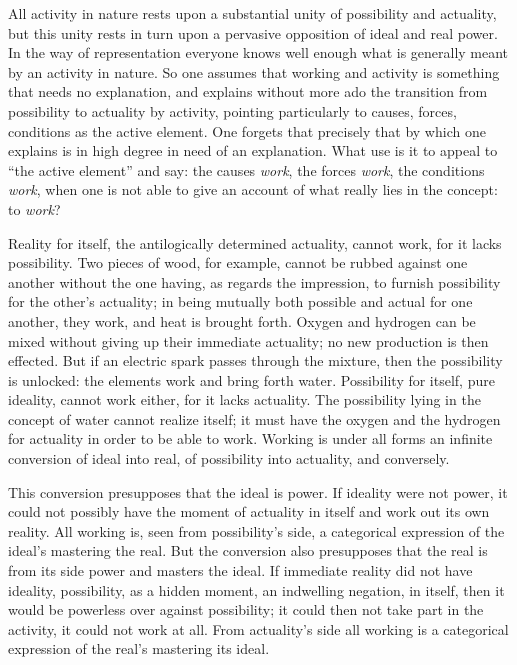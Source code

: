 \documentclass[12pt,a4paper]{book}
\begin{document}
All activity in nature rests upon a substantial unity of possibility and actuality, but this unity rests in turn upon
a pervasive opposition of ideal and real power. In the way of representation everyone knows well enough what is
generally meant by an activity in nature. So one assumes that working and activity is something that needs no
explanation, and explains without more ado the transition from possibility to actuality by activity,
pointing particularly to causes, forces, conditions as the active element. One forgets that precisely that by which
one explains is in high degree in need of an explanation. What use is it to appeal to ``the active element'' and say:
the causes \emph{work}, the forces \emph{work}, the conditions \emph{work}, when one is not able to give an account of
what really lies in the concept: to \emph{work}?

Reality for itself, the antilogically determined actuality, cannot work, for it lacks possibility. Two pieces of wood,
for example, cannot be rubbed against one another without the one having, as regards the impression, to furnish
possibility for the other's actuality; in being mutually both possible and actual for one another, they work, and heat
is brought forth. Oxygen and hydrogen can be mixed without giving up their immediate actuality; no new production is
then effected. But if an electric spark passes through the mixture, then the possibility is unlocked: the elements
work and bring forth water. Possibility for itself, pure ideality, cannot work either, for it lacks actuality. The
possibility lying in the concept of water cannot realize itself; it must have the oxygen and the hydrogen for
actuality in order to be able to work. Working is under all forms an infinite conversion of ideal into real, of
possibility into actuality, and conversely.

This conversion presupposes that the ideal is power. If ideality were not power, it could not possibly have the moment
of actuality in itself and work out its own reality. All working is, seen from possibility's side, a categorical
expression of the ideal's mastering the real. But the conversion also presupposes that the real is from its side power
and masters the ideal. If immediate reality did not have ideality, possibility, as a hidden moment, an indwelling
negation, in itself, then it would be powerless over against possibility; it could then not take part in the activity,
it could not work at all. From actuality's
side all working is a categorical expression of the real's mastering its ideal.
\end{document}
